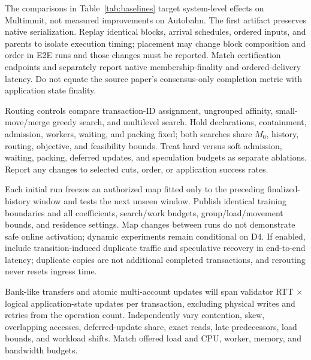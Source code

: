 The comparisons in Table~\ref{tab:baselines} target system-level effects on Multimmit, not measured improvements on Autobahn. The first artifact preserves native serialization. Replay identical blocks, arrival schedules, ordered inputs, and parents to isolate execution timing; placement may change block composition and order in E2E runs and those changes must be reported. Match certification endpoints and separately report native membership-finality and ordered-delivery latency. Do not equate the source paper's consensus-only completion metric with application state finality.


Routing controls compare transaction-ID assignment, ungrouped affinity, small-move/merge greedy search, and multilevel search. Hold declarations, containment, admission, workers, waiting, and packing fixed; both searches share \(M_0\), history, routing, objective, and feasibility bounds. Treat hard versus soft admission, waiting, packing, deferred updates, and speculation budgets as separate ablations. Report any changes to selected cuts, order, or application success rates.

Each initial run freezes an authorized map fitted only to the preceding finalized-history window and tests the next unseen window. Publish identical training boundaries and all coefficients, search/work budgets, group/load/movement bounds, and residence settings. Map changes between runs do not demonstrate safe online activation; dynamic experiments remain conditional on D4. If enabled, include transition-induced duplicate traffic and speculative recovery in end-to-end latency; duplicate copies are not additional completed transactions, and rerouting never resets ingress time.

Bank-like transfers and atomic multi-account updates will span validator RTT \(\times\) logical application-state updates per transaction, excluding physical writes and retries from the operation count. Independently vary contention, skew, overlapping accesses, deferred-update share, exact reads, late predecessors, load bounds, and workload shifts. Match offered load and CPU, worker, memory, and bandwidth budgets.

